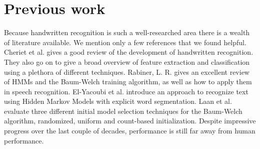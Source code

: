 \section{Previous work}
Because handwritten recognition is such a well-researched area there is a wealth of literature available.%
We mention only a few references that we found helpful.
Cheriet et al. \cite{Cheriet} gives a good review of the development of handwritten recognition.
They also go on to give a broad overview of feature extraction and classification using a plethora of different techniques.
Rabiner, L. R. \cite{Rabiner1989} gives an excellent review of HMMs and the Baum-Welch training algorithm, as well as how to apply them in speech recognition.
El-Yacoubi et al. \cite{intro-Yacoubi} introduce an approach to recognize text using Hidden Markov Models with explicit word segmentation.
Laan et al. \cite{initialmodel} evaluate three different initial model selection techniques for the Baum-Welch algorithm, randomized, uniform and count-based initialization.
Despite impressive progress over the last couple of decades, performance is still far away from human performance.


